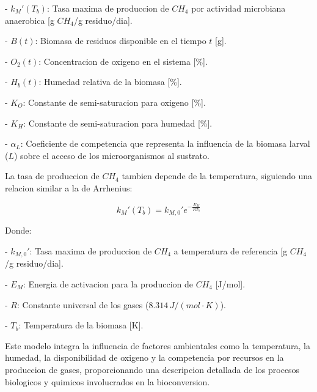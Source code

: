 - $k_M'(T_b)$: Tasa maxima de produccion de $CH_4$ por actividad microbiana anaerobica [g $CH_4$/g residuo/dia].

- $B(t)$: Biomasa de residuos disponible en el tiempo $t$ [g].

- $O_2(t)$: Concentracion de oxigeno en el sistema [\%].

- $H_b(t)$: Humedad relativa de la biomasa [\%].

- $K_O$: Constante de semi-saturacion para oxigeno [\%].

- $K_H$: Constante de semi-saturacion para humedad [\%].

- $\alpha_L$: Coeficiente de competencia que representa la influencia de la biomasa larval ($L$) sobre el acceso de los microorganismos al sustrato.

\vspace{1cm}
La tasa de produccion de $CH_4$ tambien depende de la temperatura, siguiendo una relacion similar a la de Arrhenius:

\begin{equation}
k_M'(T_b) = k_{M,0}' e^{-\frac{E_M}{R T_b}}
\end{equation}

Donde:

- $k_{M,0}'$: Tasa maxima de produccion de $CH_4$ a temperatura de referencia [g $CH_4$/g residuo/dia].

- $E_M$: Energia de activacion para la produccion de $CH_4$ [J/mol].

- $R$: Constante universal de los gases ($8.314\, J/(mol \cdot K)$).

- $T_b$: Temperatura de la biomasa [K].

\vspace{1cm}
Este modelo integra la influencia de factores ambientales como la temperatura, la humedad, la disponibilidad de oxigeno y la competencia por recursos en la produccion de gases, proporcionando una descripcion detallada de los procesos biologicos y quimicos involucrados en la bioconversion.
